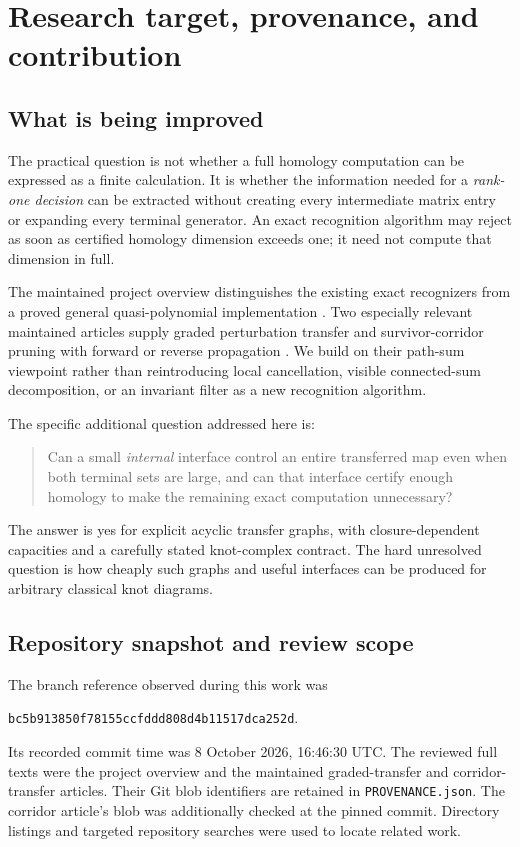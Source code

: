 \documentclass[11pt,letterpaper]{article}
\theoremstyle{definition}\newtheorem{definition}[theorem]{Definition}
\theoremstyle{remark}\newtheorem{remark}[theorem]{Remark}
\newcommand{\code}[1]{\texttt{#1}}
\begin{document}
\section{Research target, provenance, and contribution}
\subsection{What is being improved}
The practical question is not whether a full homology computation can be
expressed as a finite calculation. It is whether the information needed for a
\emph{rank-one decision} can be extracted without creating every intermediate
matrix entry or expanding every terminal generator. An exact recognition
algorithm may reject as soon as certified homology dimension exceeds one;
it need not compute that dimension in full.

The maintained project overview distinguishes the existing exact recognizers
from a proved general quasi-polynomial implementation \cite{repo}.
Two especially relevant maintained articles supply graded perturbation
transfer and survivor-corridor pruning with forward or reverse propagation
\cite{repograded,repocorridor}. We build on their path-sum viewpoint rather than
reintroducing local cancellation, visible connected-sum decomposition, or
an invariant filter as a new recognition algorithm.

The specific additional question addressed here is:
\begin{quote}
Can a small \emph{internal} interface control an entire transferred map even
when both terminal sets are large, and can that interface certify enough
homology to make the remaining exact computation unnecessary?
\end{quote}
The answer is yes for explicit acyclic transfer graphs, with closure-dependent
capacities and a carefully stated knot-complex contract. The hard unresolved
question is how cheaply such graphs and useful interfaces can be produced
for arbitrary classical knot diagrams.

\subsection{Repository snapshot and review scope}
The branch reference observed during this work was
\begin{center}\small
\code{bc5b913850f78155ccfddd808d4b11517dca252d}.
\end{center}
Its recorded commit time was 8 October 2026, 16:46:30 UTC. The reviewed
full texts were the project overview and the maintained graded-transfer and
corridor-transfer articles. Their Git blob identifiers are retained in
\code{PROVENANCE.json}. The corridor article's blob was additionally checked
at the pinned commit. Directory listings and targeted repository searches
were used to locate related work.
\end{document}
